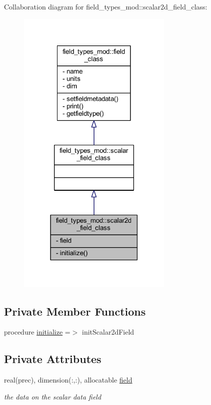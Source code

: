 Collaboration diagram for field\+\_\+types\+\_\+mod\+:\+:scalar2d\+\_\+field\+\_\+class\+:\nopagebreak
\begin{figure}[H]
\begin{center}
\leavevmode
\includegraphics[width=210pt]{structfield__types__mod_1_1scalar2d__field__class__coll__graph}
\end{center}
\end{figure}
\subsection*{Private Member Functions}
\begin{DoxyCompactItemize}
\item 
procedure \mbox{\hyperlink{structfield__types__mod_1_1scalar2d__field__class_a78514d47bb800d9945fefb22bdf16073}{initialize}} =$>$ init\+Scalar2d\+Field
\end{DoxyCompactItemize}
\subsection*{Private Attributes}
\begin{DoxyCompactItemize}
\item 
real(prec), dimension(\+:,\+:), allocatable \mbox{\hyperlink{structfield__types__mod_1_1scalar2d__field__class_a118246d78eca3dd11517254a4bf5fef0}{field}}
\begin{DoxyCompactList}\small\item\em the data on the scalar data field \end{DoxyCompactList}\end{DoxyCompactItemize}


